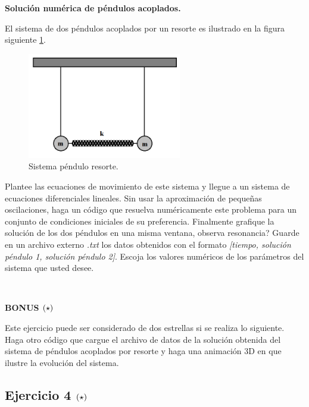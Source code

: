 \textbf{Solución numérica de péndulos acoplados.}

El sistema de dos péndulos acoplados por un resorte es ilustrado en la figura
siguiente \ref{fig:spring_acopled_pendulums}.


\begin{figure}[htbp]
	\centering
	\includegraphics[width=0.60\textwidth]
	{./pictures/acopled_pendulum_spring.png}

	\caption{\small{Sistema péndulo resorte.}}
	
	\label{fig:spring_acopled_pendulums}
\end{figure}


Plantee las ecuaciones de movimiento de este sistema y llegue a un sistema 
de ecuaciones diferenciales lineales. Sin usar la aproximación de pequeñas 
oscilaciones, haga un código que resuelva numéricamente este problema para 
un conjunto de condiciones iniciales de su preferencia. Finalmente grafique 
la solución de los dos péndulos en una misma ventana, observa resonancia?
Guarde en un archivo externo \textit{.txt} los datos obtenidos con el formato 
\textit{[tiempo, solución péndulo 1, solución péndulo 2]}.
Escoja los valores numéricos de los parámetros del sistema que usted desee.

\

\textbf{BONUS \large{$\left( \star \right)$}}

Este ejercicio puede ser considerado de dos estrellas si se realiza lo 
siguiente. Haga otro código que cargue el archivo de datos de la solución 
obtenida del sistema de péndulos acoplados por resorte y haga una animación 
3D en \mayavi que ilustre la evolución del sistema.

\newpage
\subsection*{Ejercicio 4 \large{$\left( \star \right)$}}

